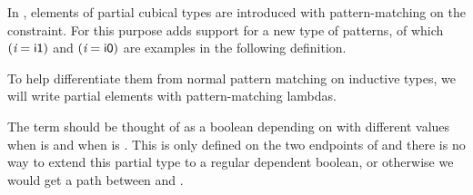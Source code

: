 In \CubicalAgda, elements of partial cubical types are introduced with 
pattern-matching on the constraint.
% 
For this purpose \CubicalAgda adds support for a new type of patterns, 
of which $(\var{i} = \con{i1})$ and $(\var{i} = \con{i0})$ are examples in
the following definition.
%

To help differentiate them from normal pattern matching on inductive types,
we will write partial elements with pattern-matching lambdas.
% 

The term  should be thought of as a boolean
depending on  with different values when  is 
and when  is .
This is only defined on the two endpoints of  and there is no
way to extend this partial type to a regular dependent boolean, or otherwise
we would get a path between  and .\\

